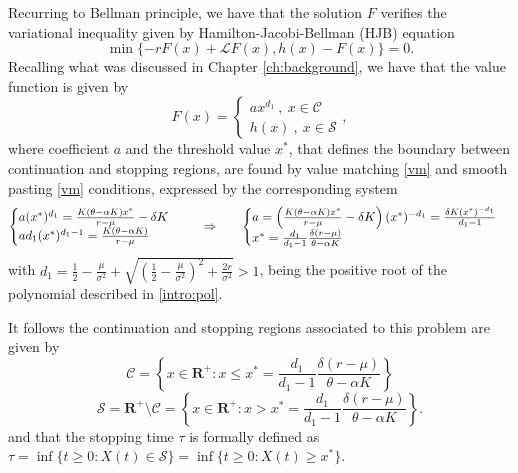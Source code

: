 Recurring to Bellman principle, we have that the solution $F$ verifies the variational inequality given by Hamilton-Jacobi-Bellman (HJB) equation
\begin{equation}
\min \{ -rF(x)+ \mathcal{L}F(x), h(x)-F(x) \} =0.
\label{eq:HJB}
\end{equation}
Recalling what was discussed in Chapter \ref{ch:background}, we have that the value function is given by
\begin{equation}
F(x)=\begin{cases} a x^{d_1}  \ , \ x \in \mathcal{C} \\
h(x) \ , \ x \in \mathcal{S}
\end{cases},
\label{1_F}
\end{equation}
where coefficient $a$ and the threshold value $x^*$, that defines the boundary between continuation and stopping regions, are found by value matching \eqref{vm} and smooth pasting \eqref{vm} conditions, expressed by the corresponding system
\begin{equation}
\begin{cases} a(x^*)^{d_1}=\frac{K(\theta-\alpha K) x^*}{r-\mu} - \delta K \\
ad_1(x^*)^{d_1-1}=\frac{K(\theta-\alpha K)}{r-\mu}
\end{cases}
\hspace{5mm} \Rightarrow \ \hspace{5mm}
\begin{cases}
a= \left( \frac{K(\theta-\alpha K) x^*}{r-\mu} - \delta K \right)(x^*)^{-d_1} = \frac{\delta K (x^*)^{-d_1}}{d_1-1}\\
x^*=\frac{d_1}{d_1-1} \frac{ \delta (r-\mu)}{\theta-\alpha K}
\end{cases}
\label{eq:sistema}
\end{equation}
with $d_1=\frac{1}{2}-\frac{\mu}{\sigma^2} +\sqrt{\left( \frac{1}{2} -\frac{\mu}{\sigma^2} \right) ^2+ \frac{2r}{\sigma^2}}>1$, being the positive root of the polynomial described in \eqref{intro:pol}.

It follows the continuation and stopping regions associated to this problem are given by
$$\mathcal{C}=\left\{ x \in \textbf{R}^+: x \leq x^* = \frac{d_1}{d_1-1} \frac{ \delta (r-\mu)}{\theta-\alpha K} \right\}$$
$$\mathcal{S}=\textbf{R}^+ \setminus \mathcal{C}= \left\{ x \in \textbf{R}^+: x > x^* = \frac{d_1}{d_1-1} \frac{ \delta (r-\mu)}{\theta-\alpha K} \right\}.$$
and that the stopping time $\tau$ is formally defined as $\tau=\inf\{t\geq0: X(t) \in \mathcal{S} \}=\inf\{t\geq 0: X(t) \geq x^* \}$.


